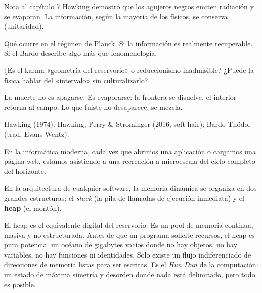 \begin{notacap}{Nota al capítulo 7}
 Hawking demostró que los agujeros negros emiten radiación y se evaporan. La información, según la mayoría de los físicos, se conserva (unitaridad).

 Qué ocurre en el régimen de Planck. Si la información es realmente recuperable. Si el Bardo describe algo más que fenomenología.

 ¿Es el karma «geometría del reservorio» o reduccionismo inadmisible? ¿Puede la física hablar del «intervalo» sin culturalizarlo?

 La muerte no es apagarse. Es evaporarse: la frontera se disuelve, el interior retorna al campo. Lo que fuiste no desaparece; se mezcla.

 Hawking (1974); Hawking, Perry \& Strominger (2016, soft hair); Bardo Thödol (trad. Evans-Wentz).
\end{notacap}
\noindent {}

En la informática moderna, cada vez que abrimos una aplicación o cargamos una página web, estamos asistiendo a una recreación a microescala del ciclo completo del horizonte.


\noindent En la arquitectura de cualquier software, la memoria dinámica se organiza en dos grandes estructuras: el \emph{stack} (la pila de llamadas de ejecución inmediata) y el \textbf{heap} (el montón).

El heap es el equivalente digital del reservorio. Es un pool de memoria continua, masiva y no estructurada. Antes de que un programa solicite recursos, el heap es pura potencia: un océano de gigabytes vacíos donde no hay objetos, no hay variables, no hay funciones ni identidades. Solo existe un flujo indiferenciado de direcciones de memoria listas para ser escritas. Es el \emph{Hun Dun} de la computación: un estado de máxima simetría y desorden donde nada está delimitado, pero todo es posible.

